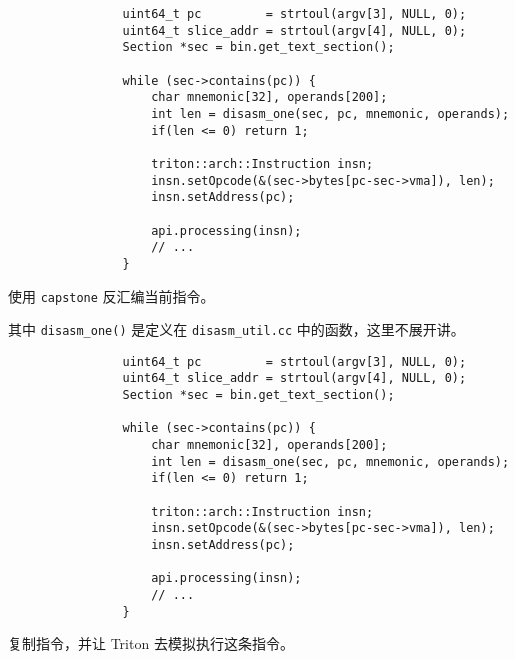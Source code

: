 \documentclass{ctexbeamer}
\begin{document}
    \begin{frame}[fragile]

        {
            \small
            \begin{verbatim}
                uint64_t pc         = strtoul(argv[3], NULL, 0);
                uint64_t slice_addr = strtoul(argv[4], NULL, 0);
                Section *sec = bin.get_text_section();
                
                while (sec->contains(pc)) {
                    char mnemonic[32], operands[200];
                    int len = disasm_one(sec, pc, mnemonic, operands);
                    if(len <= 0) return 1;

                    triton::arch::Instruction insn;
                    insn.setOpcode(&(sec->bytes[pc-sec->vma]), len);
                    insn.setAddress(pc);

                    api.processing(insn);
                    // ...
                }
            \end{verbatim}
        }

        使用 \texttt{capstone} 反汇编当前指令。\pause

        其中 \texttt{disasm_one()} 是定义在 \texttt{disasm_util.cc} 中的函数，这里不展开讲。
    
    \end{frame}

    \begin{frame}[fragile]

        {
            \small
            \begin{verbatim}
                uint64_t pc         = strtoul(argv[3], NULL, 0);
                uint64_t slice_addr = strtoul(argv[4], NULL, 0);
                Section *sec = bin.get_text_section();
                
                while (sec->contains(pc)) {
                    char mnemonic[32], operands[200];
                    int len = disasm_one(sec, pc, mnemonic, operands);
                    if(len <= 0) return 1;

                    triton::arch::Instruction insn;
                    insn.setOpcode(&(sec->bytes[pc-sec->vma]), len);
                    insn.setAddress(pc);

                    api.processing(insn);
                    // ...
                }
            \end{verbatim}
        }

        复制指令，并让 Triton 去模拟执行这条指令。
    
    \end{frame}
\end{document}
